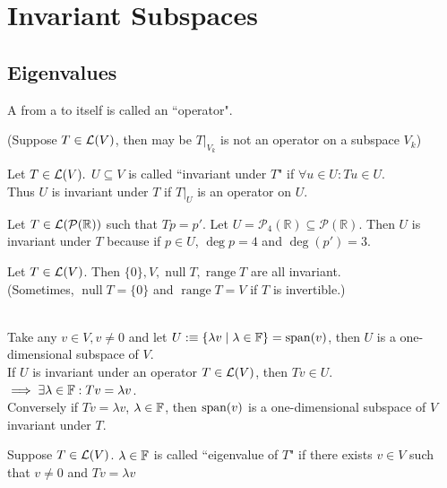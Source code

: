 \section{Invariant Subspaces}
\subsection{Eigenvalues}

\begin{mydef}
  A \lm from a \vs to itself is called an ``operator".
\end{mydef}

(Suppose $T\in \mathcal{L}(V)$, then may be $\left.T\right|_{V_{k}}$ is not an operator on a subspace $V_k$)

\begin{mydef}
  Let $T\in \mathcal{L}(V).$ $U \subseteq V$ is called ``invariant under $T$" if $\forall u \in U: Tu \in U.$ \\
  Thus $U$ is invariant under $T$ if $\left.T\right|_{U}$ is an operator on $U.$
\end{mydef}

\begin{example}
  Let $T\in \mathcal{L}(\mathcal{P}(\mathbb{R}))$ such that $Tp=p'.$ Let $U=\mathcal{P}_4(\mathbb{R}) \subseteq \mathcal{P}(\mathbb{R}).$ Then $U$ is invariant under $T$
  because if $p \in U$, $\deg p = 4$ and $\deg (p')=3$.
\end{example}

\begin{example}
  Let $T\in \mathcal{L}(V)$. Then $\{0\}, V, \operatorname{null} T, \operatorname{range} T$ are all invariant. \\
  (Sometimes, $\operatorname{null} T = \{0\}$ and $\operatorname{range} T=V$ if $T$ is invertible.)
\end{example}

 \\
Take any $v\in V, v\neq 0$ and let $U :\equiv \{  \lambda v \mid \lambda \in \mathbb{F} \} = \operatorname{span} (v)$, then $U$ is a one-dimensional subspace of $V$. \\
If $U$ is invariant under an operator $T \in \mathcal{L} (V)$, then $Tv  \in U$. $\implies \exists \lambda \in \mathbb{F}: Tv = \lambda v$. \\
Conversely if $Tv = \lambda v$, $\lambda \in \mathbb{F}$, then $\operatorname{span} (v)$ is a one-dimensional subspace of $V$ invariant under $T$.

\begin{mydef}
  Suppose $T\in \mathcal{L} (V)$. $\lambda \in \mathbb{F}$ is called ``eigenvalue of $T$" if there exists $v \in V$ such that $v \neq 0$ and $Tv = \lambda v$
\end{mydef}

